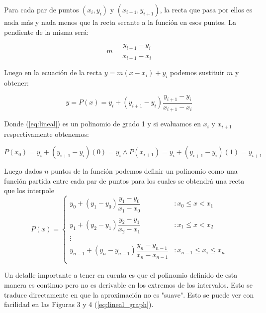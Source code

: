 \vspace{4mm}
Para cada par de puntos $(x_i, y_i)$ y $(x_{i+1}, y_{i+1})$, la recta que pasa por ellos es nada más y nada menos que la recta secante a la función en esos puntos. La pendiente de la misma será:

\begin{equation}
	 m = \dfrac{y_{i+1} - y_i}{x_{i+1} - x_i}
\end{equation}

Luego en la ecuación de la recta $y = m(x - x_i) + y_i$ podemos sustituir $m$ y 
obtener:

\begin{equation} \label{eq:lineal}
	 y = P(x) = y_i + (y_{i+1} - y_i)\dfrac{y_{i+1} - y_i}{x_{i+1} - x_i} 
\end{equation} 

Donde (\ref{eq:lineal}) es un polinomio de grado 1 y si evaluamos en $x_i$ y $x_{i+1}$ respectivamente obtenemos:

\begin{equation}
	 P(x_0) = y_i + (y_{i+1} - y_i)(0) = y_i \wedge P(x_{i+1}) = y_i + (y_{i+1} - y_i)(1) = y_{i+1} 
\end{equation}

Luego dados $n$ puntos de la función podemos definir un polinomio como una función partida entre cada par de puntos para los cuales se obtendrá una recta que los interpole
\vspace{4mm}
 \begin{displaymath}
   P(x) = \left\{
     \begin{array}{lr}
       y_0 + (y_1 - y_0)\dfrac{y_1 - y_0}{x_1 - x_0}  & : x_0 \leq x < x_1\\\\
       y_1 + (y_2 - y_1)\dfrac{y_2 - y_1}{x_2 - x_1}  & : x_1 \leq x < x_2\\
       \vdots\\
       y_{n-1} + (y_n - y_{n-1})\dfrac{y_n - y_{n-1}}{x_n - x_{n-1}}  & : x_{n-1}	\leq x_i \leq x_n\\
     \end{array}
   \right.
\end{displaymath} 

Un detalle importante a tener en cuenta es que el polinomio definido de esta manera es continuo pero no es derivable en los extremos de los intervalos. Esto se traduce directamente en que la aproximación no es "suave". Esto se puede ver con facilidad en las Figuras 3 y 4 (\ref{eq:lineal_graph}).

